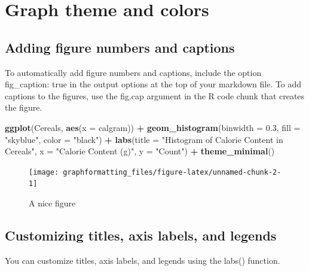 \documentclass[
]{book}
\newenvironment{Shaded}{\begin{snugshade}}{\end{snugshade}}
\newcommand{\AttributeTok}[1]{\textcolor[rgb]{0.13,0.29,0.53}{#1}}
\newcommand{\FloatTok}[1]{\textcolor[rgb]{0.00,0.00,0.81}{#1}}
\newcommand{\FunctionTok}[1]{\textcolor[rgb]{0.13,0.29,0.53}{\textbf{#1}}}
\newcommand{\NormalTok}[1]{#1}
\newcommand{\SpecialCharTok}[1]{\textcolor[rgb]{0.81,0.36,0.00}{\textbf{#1}}}
\newcommand{\StringTok}[1]{\textcolor[rgb]{0.31,0.60,0.02}{#1}}
\begin{document}
\hypertarget{graph-theme-and-colors}{%
\section{Graph theme and colors}\label{graph-theme-and-colors}}

\hypertarget{adding-figure-numbers-and-captions}{%
\subsection{Adding figure numbers and captions}\label{adding-figure-numbers-and-captions}}

To automatically add figure numbers and captions, include the option fig\_caption: true in the output options at the top of your markdown file. To add captions to the figures, use the fig.cap argument in the R code chunk that creates the figure.

\begin{Shaded}
\begin{Highlighting}[]
\FunctionTok{ggplot}\NormalTok{(Cereals, }\FunctionTok{aes}\NormalTok{(}\AttributeTok{x =}\NormalTok{ calgram)) }\SpecialCharTok{+}
  \FunctionTok{geom\_histogram}\NormalTok{(}\AttributeTok{binwidth =} \FloatTok{0.3}\NormalTok{, }\AttributeTok{fill =} \StringTok{"skyblue"}\NormalTok{, }\AttributeTok{color =} \StringTok{"black"}\NormalTok{) }\SpecialCharTok{+}
  \FunctionTok{labs}\NormalTok{(}\AttributeTok{title =} \StringTok{"Histogram of Calorie Content in Cereals"}\NormalTok{,}
       \AttributeTok{x =} \StringTok{"Calorie Content (g)"}\NormalTok{,}
       \AttributeTok{y =} \StringTok{"Count"}\NormalTok{) }\SpecialCharTok{+}
  \FunctionTok{theme\_minimal}\NormalTok{()}
\end{Highlighting}
\end{Shaded}

\begin{figure}
\texttt{[image: graphformatting\_files/figure-latex/unnamed-chunk-2-1]} \caption{A nice figure}\label{fig:unnamed-chunk-2}
\end{figure}

\hypertarget{customizing-titles-axis-labels-and-legends}{%
\subsection{Customizing titles, axis labels, and legends}\label{customizing-titles-axis-labels-and-legends}}

You can customize titles, axis labels, and legends using the labs() function.
\end{document}
